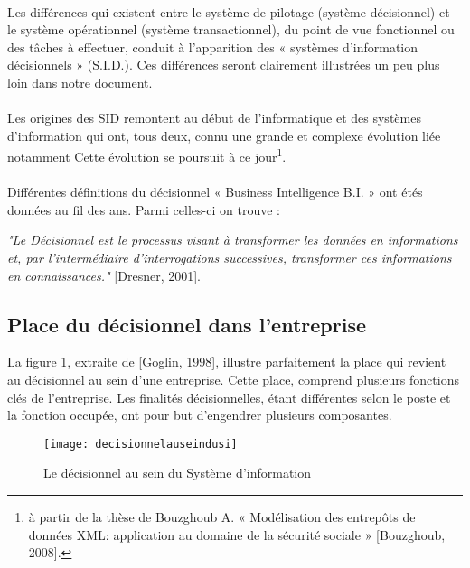 \paragraph{}
Les différences qui existent entre le système de pilotage (système décisionnel) et le système opérationnel (système transactionnel), du point de vue fonctionnel ou des tâches à effectuer, conduit à l’apparition des « systèmes d’information décisionnels » (S.I.D.). Ces différences seront clairement illustrées un peu plus loin dans notre document.
\paragraph{}

Les origines des SID remontent au début de l’informatique et des systèmes d’information
qui ont, tous deux, connu une grande et complexe évolution liée notamment Cette évolution se poursuit à ce jour\footnote{à partir de la thèse de Bouzghoub A. « Modélisation des entrepôts de données XML: application au domaine de la sécurité sociale » [Bouzghoub, 2008].}.
\paragraph{}
Différentes définitions du décisionnel « Business Intelligence B.I. » ont étés données au fil des ans. Parmi celles-ci on trouve : 

\textit{"Le Décisionnel est le processus visant à transformer les données en informations et,
par l'intermédiaire d'interrogations successives, transformer ces informations en
connaissances."} [Dresner, 2001].

\subsection{Place du décisionnel dans l’entreprise}
La figure \ref{fig:decisionnelauseindusi}, extraite de [Goglin, 1998], illustre parfaitement la place qui revient au décisionnel au sein d’une entreprise. Cette place, comprend plusieurs fonctions clés de l’entreprise. Les finalités décisionnelles, étant différentes selon le poste et la fonction occupée, ont pour but d’engendrer plusieurs composantes.

\begin{figure}[H]
    \centering
    \texttt{[image: decisionnelauseindusi]}
    \caption{Le décisionnel au sein du Système d’information}
    \label{fig:decisionnelauseindusi}
\end{figure}

